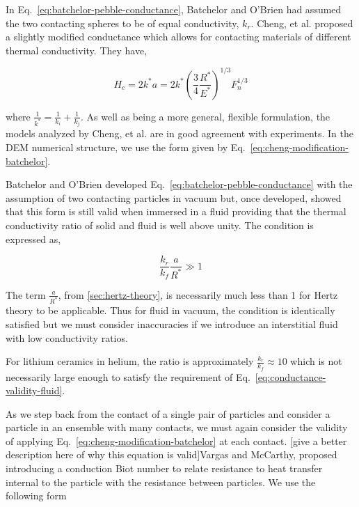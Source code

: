 In Eq.~\ref{eq:batchelor-pebble-conductance}, Batchelor and O'Brien had assumed the two contacting spheres to be of equal conductivity, $k_r$. Cheng, et al.\cite{Cheng19994199} proposed a slightly modified conductance which allows for contacting materials of different thermal conductivity. They have,

\begin{equation}\label{eq:cheng-modification-batchelor}
	H_c = 2k^*a = 2k^* \left(\frac{3}{4}\frac{R^*}{E^*}\right)^{1/3}F_n^{1/3}
\end{equation}

where $\frac{1}{k^*} = \frac{1}{k_i} + \frac{1}{k_j}$. As well as being a more general, flexible formulation, the models analyzed by Cheng, et al.\cite{Cheng19994199} are in good agreement with experiments. In the DEM numerical structure, we use the form given by Eq.~\ref{eq:cheng-modification-batchelor}.

Batchelor and O'Brien developed Eq.~\ref{eq:batchelor-pebble-conductance} with the assumption of two contacting particles in vacuum but, once developed, showed\cite{Batchelor1977} that this form is still valid when immersed in a fluid providing that the thermal conductivity ratio of solid and fluid is well above unity. The condition is expressed as,

\begin{equation}\label{eq:conductance-validity-fluid}
	\frac{ k_r }{ k_f } \frac{a}{R^*} \gg 1
\end{equation}

The term $\frac{a}{R^*}$, from \cref{sec:hertz-theory}, is necessarily much less than 1 for Hertz theory to be applicable. Thus for fluid in vacuum, the condition is identically satisfied but we must consider inaccuracies if we introduce an interstitial fluid with low conductivity ratios. 

For lithium ceramics in helium, the ratio is approximately $\frac{k_r}{k_f} \approx 10$ which is not necessarily large enough to satisfy the requirement of Eq.~\ref{eq:conductance-validity-fluid}.

As we step back from the contact of a single pair of particles and consider a particle in an ensemble with many contacts, we must again consider the validity of applying Eq.~\ref{eq:cheng-modification-batchelor} at each contact. [give a better description here of why this equation is valid]Vargas and McCarthy\cite{Vargas2002a}, proposed introducing a conduction Biot number to relate resistance to heat transfer internal to the particle with the resistance between particles. We use the following form

